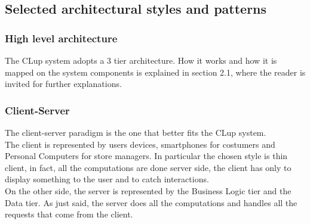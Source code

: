 \documentclass[]{article}
\begin{document}
	
	\newpage
	
	
	
	\newpage
	\subsection{Selected architectural styles and patterns}
	\medskip
	
	\subsubsection{High level architecture}
	The CLup system adopts a 3 tier architecture. 
	How it works and how it is mapped on the system components is explained in section 2.1, where the reader is invited for further explanations.
	
	\subsubsection{Client-Server}
	The client-server paradigm is the one that better fits the CLup system.
	\\The client is represented by users devices, smartphones for costumers and Personal Computers for store managers. In particular the chosen style is thin client, in fact, all the computations are done server side, the client has only to display something to the user and to catch interactions.
	\\On the other side, the server is represented by the Business Logic tier and the Data tier. As just said, the server does all the computations and handles all the requests that come from the client. 
	
\end{document}
